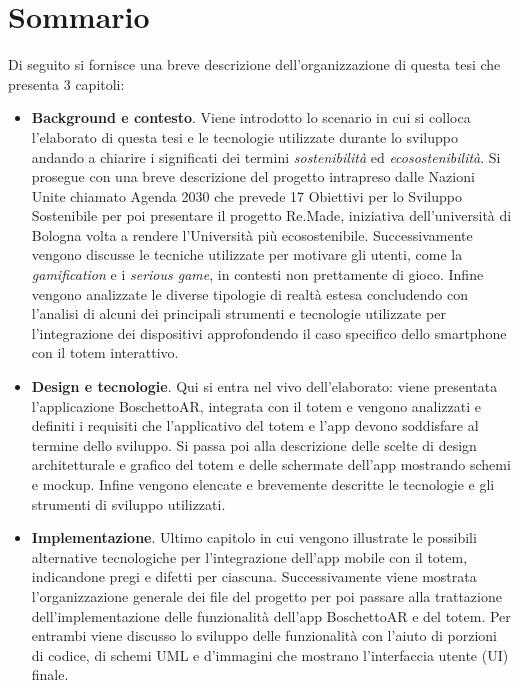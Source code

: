 \section*{Sommario}
Di seguito si fornisce una breve descrizione dell'organizzazione di questa tesi che presenta 3 capitoli: 
\begin{itemize}
    \itemsep1em
    \item \textbf{Background e contesto}. Viene introdotto lo scenario in cui si colloca l'elaborato di questa tesi e le tecnologie utilizzate durante lo sviluppo andando a chiarire i significati dei termini \textit{sostenibilità} ed \textit{ecosostenibilità}. Si prosegue con una breve descrizione del progetto intrapreso dalle Nazioni Unite chiamato Agenda 2030 che prevede 17 Obiettivi per lo Sviluppo Sostenibile per poi presentare il progetto Re.Made, iniziativa dell'università di Bologna volta a rendere l'Università più ecosostenibile.
    Successivamente vengono discusse le tecniche utilizzate per motivare gli utenti, come la \textit{gamification} e i \textit{serious game}, in contesti non prettamente di gioco. Infine vengono analizzate le diverse tipologie di realtà estesa concludendo con l'analisi di alcuni dei principali strumenti e tecnologie utilizzate per l'integrazione dei dispositivi approfondendo il caso specifico dello smartphone con il totem interattivo.
    \item \textbf{Design e tecnologie}. Qui si entra nel vivo dell'elaborato: viene presentata l'applicazione BoschettoAR, integrata con il totem e vengono analizzati e definiti i requisiti che l'applicativo del totem e l'app devono soddisfare al termine dello sviluppo. Si passa poi alla descrizione delle scelte di design architetturale e grafico del totem e delle schermate dell'app mostrando schemi e mockup. Infine vengono elencate e brevemente descritte le tecnologie e gli strumenti di sviluppo utilizzati.
    \item \textbf{Implementazione}. Ultimo capitolo in cui vengono illustrate le possibili alternative tecnologiche per l'integrazione dell'app mobile con il totem, indicandone pregi e difetti per ciascuna. Successivamente viene mostrata l'organizzazione generale dei file del progetto per poi passare alla trattazione dell'implementazione delle funzionalità dell'app BoschettoAR e del totem.
    Per entrambi viene discusso lo sviluppo delle funzionalità con l'aiuto di porzioni di codice, di schemi UML e d'immagini che mostrano l'interfaccia utente (UI) finale.
\end{itemize}